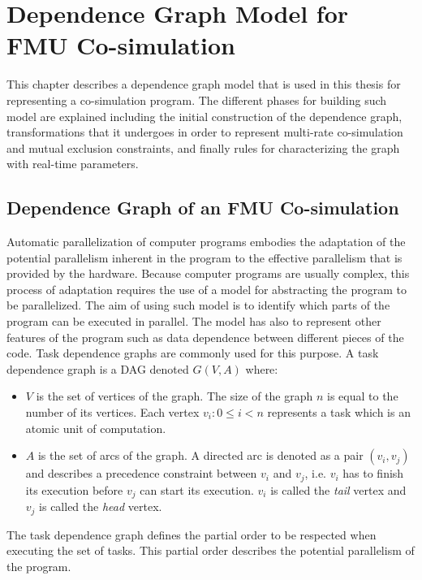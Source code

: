 \chapter{\label{ch:4-accel}Dependence Graph Model for FMU Co-simulation} 

\minitoc

This chapter describes a dependence graph model that is used in this thesis for representing a co-simulation program. The different phases for building such model are explained including the initial construction of the dependence graph, transformations that it undergoes in order to represent multi-rate co-simulation and mutual exclusion constraints, and finally rules for characterizing the graph with real-time parameters.
 
\section{\label{sec:4-depgrph}Dependence Graph of an FMU Co-simulation}

Automatic parallelization of computer programs embodies the adaptation of the potential parallelism inherent in the program to the effective parallelism that is provided by the hardware. Because computer programs are usually complex, this process of adaptation requires the use of a model for abstracting the program to be parallelized. The aim of using such model is to identify which parts of the program can be executed in parallel. The model has also to represent other features of the program such as data dependence between different pieces of the code. Task dependence graphs are commonly used for this purpose. A task dependence graph is a DAG denoted $G(V,A)$ where:
\begin{itemize}
\item $V$ is the set of vertices of the graph. The size of the graph $n$ is equal to the number of its vertices. Each vertex $v_i: 0 \leq i < n$ represents a task which is an atomic unit of computation.
\item $A$ is the set of arcs of the graph. A directed arc is denoted as a pair $(v_i,v_j)$ and describes a precedence constraint between $v_i$ and $v_j$, i.e. $v_i$ has to finish its execution before $v_j$ can start its execution. $v_i$ is called the \textit{tail} vertex and $v_j$ is called the \textit{head} vertex. 
\end{itemize}

The task dependence graph defines the partial order to be respected when executing the set of tasks. This partial order describes the potential parallelism of the program. %

